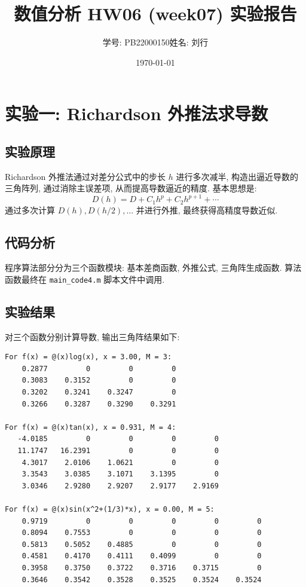 \documentclass[12pt]{article}
\title{数值分析 HW06 (week07) 实验报告}
\author{学号: PB22000150\quad 姓名: 刘行}
\date{\today}
\begin{document}
\maketitle

	\section{实验一: Richardson 外推法求导数}
		\subsection{实验原理}
			Richardson 外推法通过对差分公式中的步长 $h$ 进行多次减半, 构造出逼近导数的三角阵列, 通过消除主误差项, 从而提高导数逼近的精度. 基本思想是:
			\[ D(h) = D + C_1 h^p + C_2 h^{p+1} + \cdots \]
			通过多次计算 $D(h), D(h/2), \dots$ 并进行外推, 最终获得高精度导数近似.

		\subsection{代码分析}
			程序算法部分分为三个函数模块: 基本差商函数, 外推公式, 三角阵生成函数. 算法函数最终在 \texttt{main\_code4.m} 脚本文件中调用.

		\subsection{实验结果}
			对三个函数分别计算导数, 输出三角阵结果如下:

\begin{lstlisting}
For f(x) = @(x)log(x), x = 3.00, M = 3:
	0.2877         0         0         0
	0.3083    0.3152         0         0
	0.3202    0.3241    0.3247         0
	0.3266    0.3287    0.3290    0.3291
			
For f(x) = @(x)tan(x), x = 0.931, M = 4:
   -4.0185         0         0         0         0
   11.1747   16.2391         0         0         0
	4.3017    2.0106    1.0621         0         0
	3.3543    3.0385    3.1071    3.1395         0
	3.0346    2.9280    2.9207    2.9177    2.9169
			
For f(x) = @(x)sin(x^2+(1/3)*x), x = 0.00, M = 5:
	0.9719         0         0         0         0         0
	0.8094    0.7553         0         0         0         0
	0.5813    0.5052    0.4885         0         0         0
	0.4581    0.4170    0.4111    0.4099         0         0
	0.3958    0.3750    0.3722    0.3716    0.3715         0
	0.3646    0.3542    0.3528    0.3525    0.3524    0.3524
\end{lstlisting}
\end{document}
